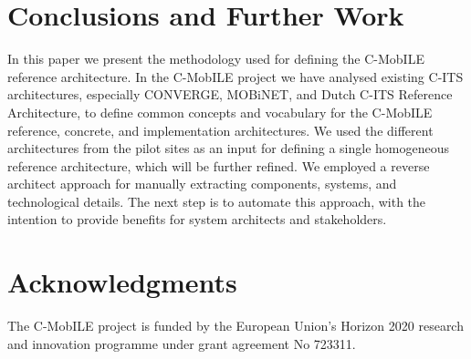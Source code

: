 \documentclass[conference]{IEEEtran}
\begin{document}
\section{Conclusions and Further Work}

In this paper we present the methodology used for defining the C-MobILE reference architecture.
In the C-MobILE project we have analysed existing C-ITS architectures, especially CONVERGE, MOBiNET, and Dutch C-ITS Reference Architecture, to define common concepts and vocabulary for the C-MobILE reference, concrete, and implementation architectures.
We used the different architectures from the pilot sites as an input for defining a single homogeneous reference architecture, which will be further refined.
We employed a reverse architect approach for manually extracting components, systems, and technological details.
The next step is to automate this approach, with the intention to provide benefits for system architects and stakeholders.


\section*{Acknowledgments}

The C-MobILE project is funded by the European Union's Horizon 2020 research and innovation programme under grant agreement No 723311.
\end{document}
